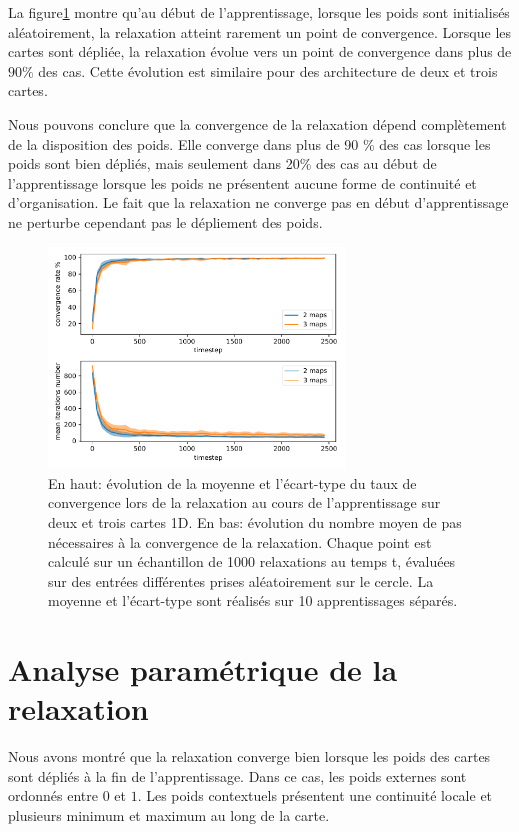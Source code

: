 \documentclass[../main]{subfiles}
\begin{document}
La figure\ref{fig:conv_evolution} montre qu'au début de l'apprentissage, lorsque les poids sont initialisés aléatoirement, la relaxation atteint rarement un point de convergence. Lorsque les cartes sont dépliée, la relaxation évolue vers un point de convergence dans plus de $90 \%$ des cas. Cette évolution est similaire pour des architecture de deux et trois cartes.

Nous pouvons conclure que la convergence de la relaxation dépend complètement de la disposition des poids. Elle converge dans plus de 90 \% des cas lorsque les poids sont bien dépliés, mais seulement dans 20\% des cas au début de l'apprentissage lorsque les poids ne présentent aucune forme de continuité et d'organisation.
Le fait que la relaxation ne converge pas en début d'apprentissage ne perturbe cependant pas le dépliement des poids.

\begin{figure}
\centering
\includegraphics[width=0.7\textwidth]{1D_conv_evolution_total.pdf}
\caption{En haut: évolution de la moyenne et l'écart-type du taux de convergence lors de la relaxation au cours de l'apprentissage sur deux et trois cartes 1D. En bas: évolution du nombre moyen de pas nécessaires à la convergence de la relaxation.
Chaque point est calculé sur un échantillon de 1000 relaxations au temps t, évaluées sur des entrées différentes prises aléatoirement sur le cercle. La moyenne et l'écart-type sont réalisés sur 10 apprentissages séparés.}
\label{fig:conv_evolution}
\end{figure}

\section{Analyse paramétrique de la relaxation}

Nous avons montré que la relaxation converge bien lorsque les poids des cartes sont dépliés à la fin de l'apprentissage. Dans ce cas, les poids externes sont ordonnés entre $0$ et $1$. Les poids contextuels présentent une continuité locale et plusieurs minimum et maximum au long de la carte.
\end{document}
